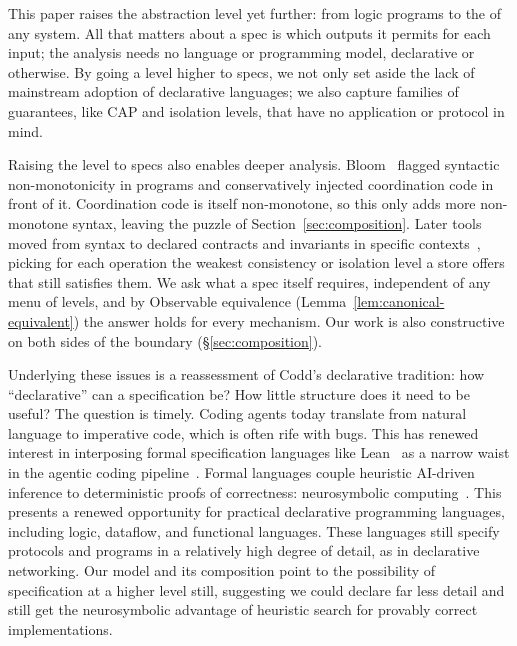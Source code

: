 This paper raises the abstraction level yet further: from logic programs to the
\spectype[s] of any system. All that matters about a spec is which outputs it
permits for each input; the analysis needs no language or programming model,
declarative or otherwise. By going a level higher to specs, we not only set
aside the lack of mainstream adoption of declarative languages; we also capture
families of guarantees, like CAP and isolation levels, that have no application
or protocol in mind.

Raising the level to specs also enables deeper analysis.
Bloom~\cite{alvaro2011bloom} flagged syntactic non-monotonicity in programs and
conservatively injected coordination code in front of it. Coordination code is
itself non-monotone, so this only adds more non-monotone syntax, leaving the
puzzle of Section~\ref{sec:composition}. Later tools moved from syntax to
declared contracts and invariants in specific
contexts~\cite{sivaramakrishnan2015quelea,kaki2018alone}, picking for each
operation the weakest consistency or isolation level a store offers that still
satisfies them. We ask what a spec itself requires, independent of any menu of
levels, and by Observable equivalence (Lemma~\ref{lem:canonical-equivalent}) the
answer holds for every mechanism. Our work is also constructive on both sides of the
boundary (\S\ref{sec:composition}).

Underlying these issues is a reassessment of Codd's declarative tradition: how
``declarative'' can a specification be? How little structure does it need to be
useful? The question is timely. Coding agents today translate from natural
language to imperative code, which is often rife with bugs. This has renewed
interest in interposing formal specification languages like
Lean~\cite{demoura2021lean4} as a narrow waist in the agentic coding pipeline~\cite{hellerstein2023codd}.
Formal languages couple heuristic
AI-driven inference to deterministic proofs of correctness: neurosymbolic
computing~\cite{an2025neurosymbolic}. This presents a renewed
opportunity for practical declarative programming languages, including logic,
dataflow, and functional languages. These languages still specify protocols and
programs in a relatively high degree of detail, as in declarative networking.
Our \spectype[] model and its composition point to the possibility of
specification at a higher level still, suggesting we could declare far less detail
and still get the neurosymbolic advantage of heuristic search for
provably correct implementations.
